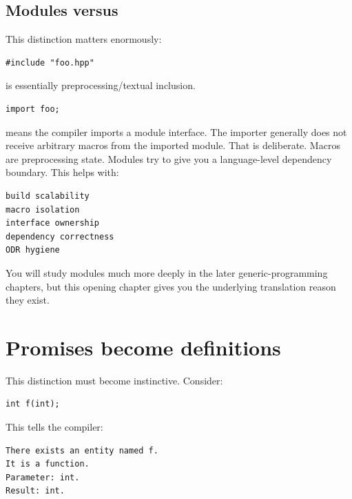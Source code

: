 \subsection{\texorpdfstring{Modules versus }{Modules versus }}\label{05-engine-i-ch002-modules-versus-include}

\hypertarget{05-engine-i-ch002-modules-versus-include}{}

This distinction matters enormously:

\begin{verbatim}
#include "foo.hpp"
\end{verbatim}

is essentially preprocessing/textual inclusion.

\begin{verbatim}
import foo;
\end{verbatim}

means the compiler imports a module interface. The importer generally does not receive arbitrary macros from the imported module. That is deliberate. Macros are preprocessing state. Modules try to give you a language-level dependency boundary. This helps with:

\begin{verbatim}
build scalability
macro isolation
interface ownership
dependency correctness
ODR hygiene
\end{verbatim}

You will study modules much more deeply in the later generic-programming chapters, but this opening chapter gives you the underlying translation reason they exist.

\section{Promises become definitions}\label{05-engine-i-ch002-promises-become-definitions}

\hypertarget{05-engine-i-ch002-promises-become-definitions}{}

This distinction must become instinctive. Consider:

\begin{verbatim}
int f(int);
\end{verbatim}

This tells the compiler:

\begin{verbatim}
There exists an entity named f.
It is a function.
Parameter: int.
Result: int.
\end{verbatim}

